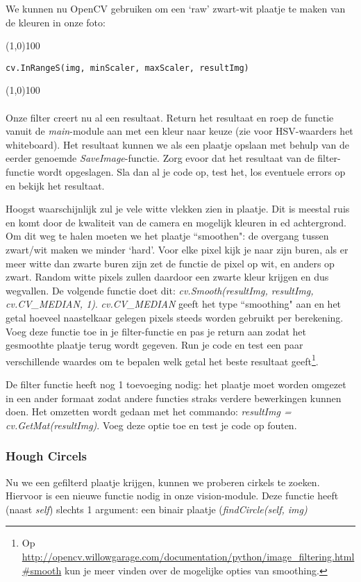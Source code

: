\documentclass[a4paper]{article}
\begin{document}
We kunnen nu OpenCV gebruiken om een `raw' zwart-wit plaatje te maken van de kleuren in onze foto:

\noindent \line(1,0){100}
\begin{verbatim}
cv.InRangeS(img, minScaler, maxScaler, resultImg)
\end{verbatim}
\noindent \line(1,0){100}
\\\\
Onze filter creert nu al een resultaat. Return het resultaat en roep de functie vanuit de \textit{main}-module aan met een kleur naar keuze (zie voor HSV-waarders het whiteboard). 
Het resultaat kunnen we als een plaatje opslaan met behulp van de eerder genoemde \textit{SaveImage}-functie. Zorg evoor dat het resultaat van de filter-functie wordt opgeslagen. Sla dan al je code op, test het, los eventuele errors op en bekijk het resultaat.

Hoogst waarschijnlijk zul je vele witte vlekken zien in plaatje. Dit is meestal ruis en komt door de kwaliteit van de camera en mogelijk kleuren in ed achtergrond. Om dit weg te halen moeten we het plaatje ``smoothen": de overgang tussen zwart/wit maken we minder `hard'. Voor elke pixel kijk je naar zijn buren, als er meer witte dan zwarte buren zijn zet de functie de pixel op wit, en anders op zwart. Random witte pixels zullen daardoor een zwarte kleur krijgen en dus wegvallen. De volgende functie doet dit: \textit{cv.Smooth(resultImg, resultImg, cv.CV\_MEDIAN, 1)}. \textit{cv.CV\_MEDIAN} geeft het type ``smoothing" aan en het getal hoeveel naastelkaar gelegen pixels steeds worden gebruikt per berekening. Voeg deze functie toe in je filter-functie en pas je return aan zodat het gesmoothte plaatje terug wordt gegeven. 
Run je code en test een paar verschillende waardes om te bepalen welk getal het beste resultaat geeft\footnote{Op \url{http://opencv.willowgarage.com/documentation/python/image_filtering.html\#smooth} kun je meer vinden over de mogelijke opties van smoothing.}.

De filter functie heeft nog 1 toevoeging nodig: het plaatje moet worden omgezet in een ander formaat zodat andere functies straks verdere bewerkingen kunnen doen. Het omzetten wordt gedaan met het commando: \textit{resultImg = cv.GetMat(resultImg)}. Voeg deze optie toe en test je code op fouten.

\subsubsection{Hough Circels}
Nu we een gefilterd plaatje krijgen, kunnen we proberen cirkels te zoeken. Hiervoor is een nieuwe functie nodig in onze vision-module. Deze functie heeft (naast \textit{self}) slechts 1 argument: een binair plaatje (\textit{findCircle(self, img)}
\end{document}
